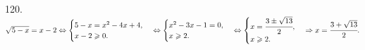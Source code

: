 120. $\sqrt{5-x}=x-2\Leftrightarrow\begin{cases} 5-x=x^2-4x+4,\\ x-2\geqslant0.\end{cases}\Leftrightarrow\begin{cases} x^2-3x-1=0,\\ x\geqslant2.\end{cases}\Leftrightarrow\begin{cases} x=\cfrac{3\pm\sqrt{13}}{2},\\ x\geqslant2.\end{cases}\Rightarrow x=\cfrac{3+\sqrt{13}}{2}.$\\
